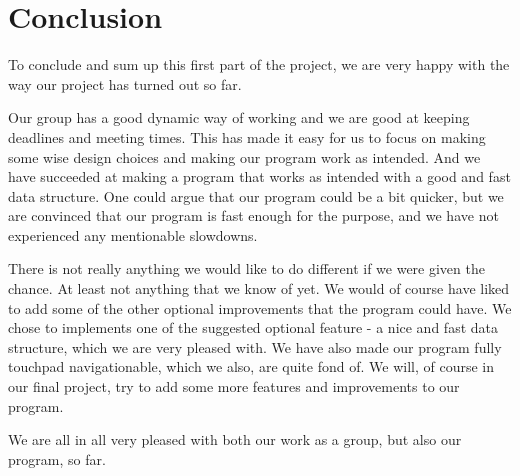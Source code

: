\documentclass[a4paper,11pt]{article}
\begin{document}
\pagebreak
\section{Conclusion} %
\label{sec:Conclusion}
To conclude and sum up this first part of the project, we are very happy with the way our project has turned out so far. 

Our group has a good dynamic way of working and we are good at keeping deadlines and meeting times. This has made it easy for us to focus on making some
wise design choices and making our program work as intended. And we have succeeded at making a program that works as intended with a good and fast data structure. One could argue that our program could be a bit quicker, but we are convinced that our program is fast enough for the purpose, and we have not experienced any mentionable slowdowns. 

There is not really anything we would like to do different if we were given the chance. At least not anything that we know of yet. We would of course have liked to add some of the other optional improvements that the program could have. We chose to implements one of the suggested optional feature - a nice and fast data structure, which we are very pleased with.
We have also made our program fully touchpad navigationable, which we also, are quite fond of. We will, of course in our final project, try to add some more features and improvements to our program.

We are all in all very pleased with both our work as a group, but also our program, so far.
\end{document}
